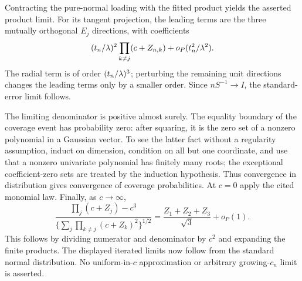 Contracting the pure-normal loading with the fitted product yields the asserted product limit. For its tangent projection, the leading terms are the three mutually orthogonal $E_j$ directions, with coefficients
\[
 (t_n/\lambda)^2\prod_{k\ne j}(c+Z_{n,k})+o_P(t_n^2/\lambda^2).
\]
The radial term is of order $(t_n/\lambda)^3$; perturbing the remaining unit directions changes the leading terms only by a smaller order. Since $nS^{-1}\to I$, the standard-error limit follows.

The limiting denominator is positive almost surely. The equality boundary of the coverage event has probability zero: after squaring, it is the zero set of a nonzero polynomial in a Gaussian vector. To see the latter fact without a regularity assumption, induct on dimension, condition on all but one coordinate, and use that a nonzero univariate polynomial has finitely many roots; the exceptional coefficient-zero sets are treated by the induction hypothesis. Thus convergence in distribution gives convergence of coverage probabilities. At $c=0$ apply the cited monomial law. Finally, as $c\to\infty$,
\[
 \frac{\prod_j(c+Z_j)-c^3}
 {\{\sum_j\prod_{k\ne j}(c+Z_k)^2\}^{1/2}}
 =\frac{Z_1+Z_2+Z_3}{\sqrt3}+o_P(1).
\]
This follows by dividing numerator and denominator by $c^2$ and expanding the finite products. The displayed iterated limits now follow from the standard normal distribution. No uniform-in-$c$ approximation or arbitrary growing-$c_n$ limit is asserted.

